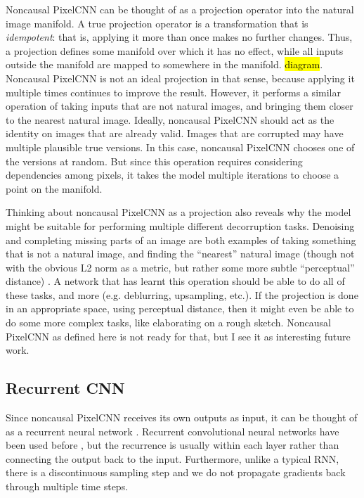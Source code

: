 \documentclass[11pt, a4paper, openany]{book}
\newcommand{\nquote}[1]{``{#1}''}
\begin{document}
Noncausal PixelCNN can be thought of as a projection operator into the natural image manifold. A true projection operator is a transformation that is \emph{idempotent}: that is, applying it more than once makes no further changes. Thus, a projection defines some manifold over which it has no effect, while all inputs outside the manifold are mapped to somewhere in the manifold. \hl{diagram}. Noncausal PixelCNN is not an ideal projection in that sense, because applying it multiple times continues to improve the result. However, it performs a similar operation of taking inputs that are not natural images, and bringing them closer to the nearest natural image. Ideally, noncausal PixelCNN should act as the identity on images that are already valid. Images that are corrupted may have multiple plausible true versions. In this case, noncausal PixelCNN chooses one of the versions at random. But since this operation requires considering dependencies among pixels, it takes the model multiple iterations to choose a point on the manifold.

Thinking about noncausal PixelCNN as a projection also reveals why the model might be suitable for performing multiple different decorruption tasks. Denoising and completing missing parts of an image are both examples of taking something that is not a natural image, and finding the \nquote{nearest} natural image (though not with the obvious L2 norm as a metric, but rather some more subtle \nquote{perceptual} distance) \citep{imageinpainting}. A network that has learnt this operation should be able to do all of these tasks, and more (e.g. deblurring, upsampling, etc.). If the projection is done in an appropriate space, using perceptual distance, then it might even be able to do some more complex tasks, like elaborating on a rough sketch. Noncausal PixelCNN as defined here is not ready for that, but I see it as interesting future work.

\subsection{Recurrent CNN}

Since noncausal PixelCNN receives its own outputs as input, it can be thought of as a recurrent neural network \citep{??}. Recurrent convolutional neural networks have been used before \citep{??,??}, but the recurrence is usually within each layer rather than connecting the output back to the input. Furthermore, unlike a typical RNN, there is a discontinuous sampling step and we do not propagate gradients back through multiple time steps.
\end{document}
